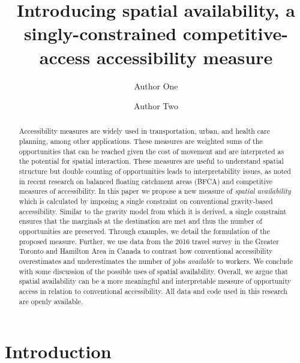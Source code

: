 \documentclass[]{elsarticle} %
\begin{document}
\begin{frontmatter}

  \title{Introducing spatial availability, a singly-constrained
competitive-access accessibility measure}
    \author[Some School]{Author One}
    \author[Some School]{Author Two}
      \address[Some School]{Address}
  
  \begin{abstract}
  Accessibility measures are widely used in transportation, urban, and
  health care planning, among other applications. These measures are
  weighted sums of the opportunities that can be reached given the cost
  of movement and are interpreted as the potential for spatial
  interaction. These measures are useful to understand spatial structure
  but double counting of opportunities leads to interpretability issues,
  as noted in recent research on balanced floating catchment areas
  (BFCA) and competitive measures of accessibility. In this paper we
  propose a new measure of \emph{spatial availability} which is
  calculated by imposing a single constraint on conventional
  gravity-based accessibility. Similar to the gravity model from which
  it is derived, a single constraint ensures that the marginals at the
  destination are met and thus the number of opportunities are
  preserved. Through examples, we detail the formulation of the proposed
  measure. Further, we use data from the 2016 travel survey in the
  Greater Toronto and Hamilton Area in Canada to contrast how
  conventional accessibility overestimates and underestimates the number
  of jobs \emph{available} to workers. We conclude with some discussion
  of the possible uses of spatial availability. Overall, we argue that
  spatial availability can be a more meaningful and interpretable
  measure of opportunity access in relation to conventional
  accessibility. All data and code used in this research are openly
  available.
  \end{abstract}
  
 \end{frontmatter}

\newpage

\hypertarget{introduction}{%
\section{Introduction}\label{introduction}}
\end{document}
